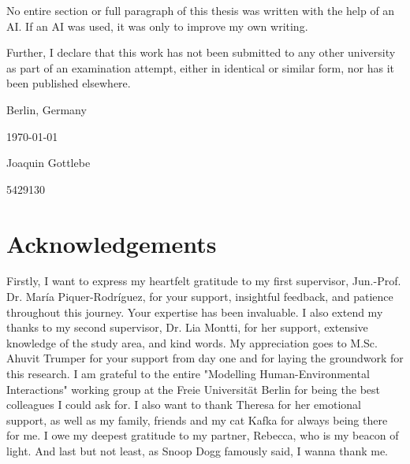 \documentclass[11pt, a4paper]{report}
\begin{document}
No entire section or full paragraph of this thesis was written with the help of an AI. If an AI was used, it was only to improve my own writing.

Further, I declare that this work has not been submitted to any other university as part of an examination attempt, either in identical or similar form, nor has it been published elsewhere.

\vfill

{
\centering

Berlin, Germany 

\today

\vspace{4em}

\underline{\hspace{6cm}}

Joaquin Gottlebe

5429130

}

\vfill

\chapter*{Acknowledgements}

Firstly, I want to express my heartfelt gratitude to my first supervisor, Jun.-Prof. Dr. María Piquer-Rodríguez, for your support, insightful feedback, and patience throughout this journey. Your expertise has been invaluable. I also extend my thanks to my second supervisor, Dr. Lia Montti, for her support, extensive knowledge of the study area, and kind words. My appreciation goes to M.Sc. Ahuvit Trumper for your support from day one and for laying the groundwork for this research. I am grateful to the entire "Modelling Human-Environmental Interactions" working group at the Freie Universität Berlin for being the best colleagues I could ask for. I also want to thank Theresa for her emotional support, as well as my family, friends and my cat Kafka for always being there for me. I owe my deepest gratitude to my partner, Rebecca, who is my beacon of light. And last but not least, as Snoop Dogg famously said, I wanna thank me.

\tableofcontents
\newpage
\listoffigures
\newpage
\listoftables
\newpage
\end{document}
